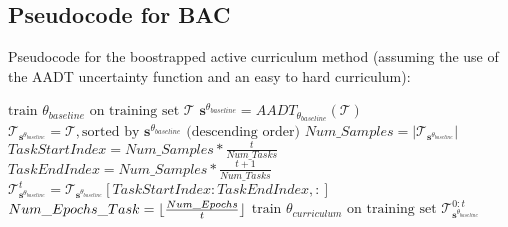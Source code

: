 \subsection{Pseudocode for BAC}\label{BACPseudocode}
Pseudocode for the boostrapped active curriculum method (assuming the use of the AADT uncertainty function and an easy to hard curriculum):
\begin{algorithmic}
\STATE $\text{train }  \theta_{baseline} \text{ on training set } \mathcal{T}$
\ENDFOR
\STATE $\mathbf{s}^{\theta_{baseline}} = AADT_{\theta_{baseline}}(\mathcal{T})$
\STATE $\mathcal{T}_{\mathbf{s}^{\theta_{baseline}}} = \mathcal{T}, \text{sorted by } \mathbf{s}^{\theta_{baseline}} \text{ (descending order)}$ 
\STATE $Num\_Samples = |\mathcal{T}_{\mathbf{s}^{\theta_{baseline}}}|$
\STATE $TaskStartIndex = Num\_Samples*\frac{t}{Num\_Tasks} $
\STATE $TaskEndIndex = Num\_Samples*\frac{t+1}{Num\_Tasks} $
\STATE $\mathcal{T}^{t}_{\mathbf{s}^{\theta_{baseline}}} = \mathcal{T}_{\mathbf{s}^{\theta_{baseline}}}[TaskStartIndex:TaskEndIndex,:] $
\ENDFOR
{}
\STATE $Num\_Epochs\_Task = \lfloor\frac{Num\_Epochs}{t}\rfloor$
\STATE $\text{train }  \theta_{curriculum} \text{ on training set } \mathcal{T}^{0:t}_{\mathbf{s}^{\theta_{baseline}}} $
\ENDFOR
\ENDFOR
\end{algorithmic}

